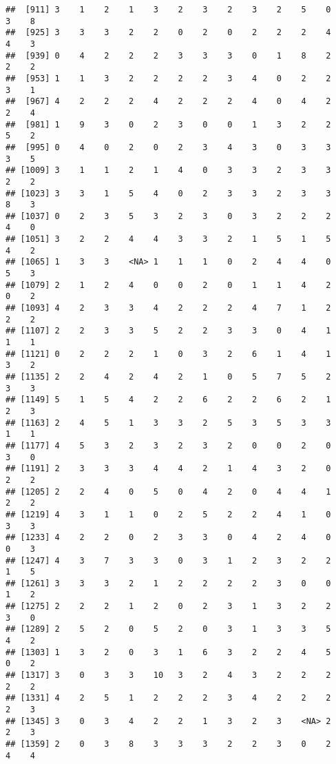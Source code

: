\documentclass[
]{article}
\begin{document}
\begin{verbatim}
##  [911] 3    1    2    1    3    2    3    2    3    2    5    0    3    8   
##  [925] 3    3    3    2    2    0    2    0    2    2    2    4    4    3   
##  [939] 0    4    2    2    2    3    3    3    0    1    8    2    2    2   
##  [953] 1    1    3    2    2    2    2    3    4    0    2    2    3    1   
##  [967] 4    2    2    2    4    2    2    2    4    0    4    2    2    4   
##  [981] 1    9    3    0    2    3    0    0    1    3    2    2    5    2   
##  [995] 0    4    0    2    0    2    3    4    3    0    3    3    3    5   
## [1009] 3    1    1    2    1    4    0    3    3    2    3    3    2    2   
## [1023] 3    3    1    5    4    0    2    3    3    2    3    3    8    3   
## [1037] 0    2    3    5    3    2    3    0    3    2    2    2    4    0   
## [1051] 3    2    2    4    4    3    3    2    1    5    1    5    4    2   
## [1065] 1    3    3    <NA> 1    1    1    0    2    4    4    0    5    3   
## [1079] 2    1    2    4    0    0    2    0    1    1    4    2    0    2   
## [1093] 4    2    3    3    4    2    2    2    4    7    1    2    2    2   
## [1107] 2    2    3    3    5    2    2    3    3    0    4    1    1    1   
## [1121] 0    2    2    2    1    0    3    2    6    1    4    1    3    2   
## [1135] 2    2    4    2    4    2    1    0    5    7    5    2    3    3   
## [1149] 5    1    5    4    2    2    6    2    2    6    2    1    2    3   
## [1163] 2    4    5    1    3    3    2    5    3    5    3    3    1    1   
## [1177] 4    5    3    2    3    2    3    2    0    0    2    0    3    0   
## [1191] 2    3    3    3    4    4    2    1    4    3    2    0    2    2   
## [1205] 2    2    4    0    5    0    4    2    0    4    4    1    2    2   
## [1219] 4    3    1    1    0    2    5    2    2    4    1    0    3    3   
## [1233] 4    2    2    0    2    3    3    0    4    2    4    0    0    3   
## [1247] 4    3    7    3    3    0    3    1    2    3    2    2    1    5   
## [1261] 3    3    3    2    1    2    2    2    2    3    0    0    1    2   
## [1275] 2    2    2    1    2    0    2    3    1    3    2    2    3    0   
## [1289] 2    5    2    0    5    2    0    3    1    3    3    5    4    2   
## [1303] 1    3    2    0    3    1    6    3    2    2    4    5    0    2   
## [1317] 3    0    3    3    10   3    2    4    3    2    2    2    2    2   
## [1331] 4    2    5    1    2    2    2    3    4    2    2    2    2    3   
## [1345] 3    0    3    4    2    2    1    3    2    3    <NA> 2    2    3   
## [1359] 2    0    3    8    3    3    3    2    2    3    0    2    4    4   

\end{verbatim}
\end{document}
